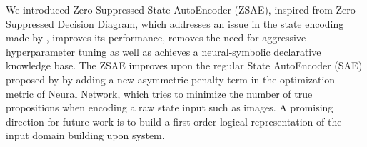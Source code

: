 We introduced Zero-Suppressed State AutoEncoder (ZSAE), inspired from
Zero-Suppressed Decision Diagram, which addresses an issue in the state
encoding made by \latentplanner, improves its performance, removes the need
for aggressive hyperparameter tuning as well as achieves a
neural-symbolic declarative knowledge base.  The ZSAE improves upon the
regular State AutoEncoder (SAE) proposed by \citeauthor{Asai2018} by
adding a new asymmetric penalty term in the optimization metric of
Neural Network, which tries to minimize the number of true propositions
when encoding a raw state input such as images.
A promising direction for future work is to build a first-order logical
representation of the input domain building upon \latentplanner system.
